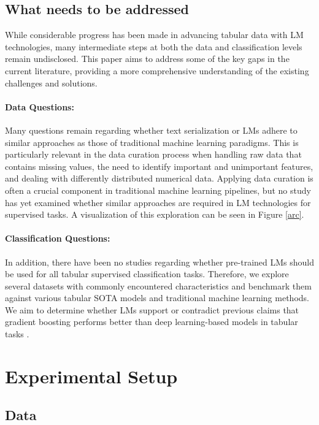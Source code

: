 \documentclass{article}
\theoremstyle{plain}
\theoremstyle{definition}
\theoremstyle{remark}
\begin{document}
\subsection*{What needs to be addressed}
\vspace{-0.1cm}
While considerable progress has been made in advancing tabular data with LM  technologies, many intermediate steps at both the data and classification levels remain undisclosed. This paper aims to address some of the key gaps in the current literature, providing a more comprehensive understanding of the existing challenges and solutions.

\paragraph{Data Questions:} Many questions remain regarding whether text serialization or LMs adhere to similar approaches as those of traditional machine learning paradigms. This is particularly relevant in the data curation process when handling raw data that contains missing values, the need to identify important and unimportant features, and dealing with differently distributed numerical data. Applying data curation is often a crucial component in traditional machine learning pipelines, but no study has yet examined whether similar approaches are required in LM technologies for supervised tasks. A visualization of this exploration can be seen in Figure \ref{arc}.

\paragraph{Classification Questions:} In addition, there have been no studies regarding whether pre-trained LMs should be used for all tabular supervised classification tasks. Therefore, we explore several datasets with commonly encountered characteristics and benchmark them against various tabular SOTA models and traditional machine learning methods. We aim to determine whether LMs support or contradict previous claims that gradient boosting performs better than deep learning-based models in tabular tasks \citep{grinsztajn2022tree}. 

\section{Experimental Setup}

\subsection{Data}
\label{data}
\end{document}
